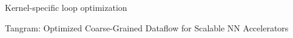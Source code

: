 
Kernel-specific loop optimization
\begin{outline}
\1 Tangram: Optimized Coarse-Grained Dataflow for Scalable NN Accelerators
\end{outline}


